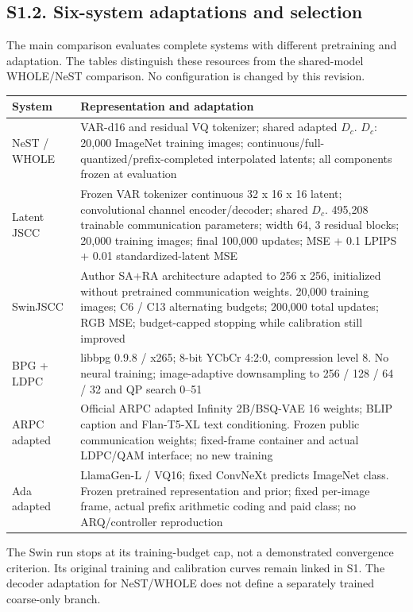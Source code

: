 \clearpage\subsection*{S1.2. Six-system adaptations and selection}
The main comparison evaluates complete systems with different pretraining and adaptation. The tables distinguish these resources from the shared-model WHOLE/NeST comparison. No configuration is changed by this revision.
\begin{center}\small\renewcommand{\arraystretch}{1.15}
\begin{tabular}{p{0.95in}p{5.2in}}\toprule
System & Representation and adaptation\\\midrule
NeST / WHOLE & VAR-d16 and residual VQ tokenizer; shared adapted $D_c$. $D_c$: 20,000 ImageNet training images; continuous/full-quantized/prefix-completed interpolated latents; all components frozen at evaluation\\[5pt]
Latent JSCC & Frozen VAR tokenizer continuous 32 x 16 x 16 latent; convolutional channel encoder/decoder; shared $D_c$. 495,208 trainable communication parameters; width 64, 3 residual blocks; 20,000 training images; final 100,000 updates; MSE + 0.1 LPIPS + 0.01 standardized-latent MSE\\[5pt]
SwinJSCC & Author SA+RA architecture adapted to 256 x 256, initialized without pretrained communication weights. 20,000 training images; C6 / C13 alternating budgets; 200,000 total updates; RGB MSE; budget-capped stopping while calibration still improved\\[5pt]
BPG + LDPC & libbpg 0.9.8 / x265; 8-bit YCbCr 4:2:0, compression level 8. No neural training; image-adaptive downsampling to 256 / 128 / 64 / 32 and QP search 0--51\\[5pt]
ARPC adapted & Official ARPC adapted Infinity 2B/BSQ-VAE 16 weights; BLIP caption and Flan-T5-XL text conditioning. Frozen public communication weights; fixed-frame container and actual LDPC/QAM interface; no new training\\[5pt]
Ada adapted & LlamaGen-L / VQ16; fixed ConvNeXt predicts ImageNet class. Frozen pretrained representation and prior; fixed per-image frame, actual prefix arithmetic coding and paid class; no ARQ/controller reproduction\\[5pt]
\bottomrule\end{tabular}\end{center}
The Swin run stops at its training-budget cap, not a demonstrated convergence criterion. Its original training and calibration curves remain linked in S1. The decoder adaptation for NeST/WHOLE does not define a separately trained coarse-only branch.
